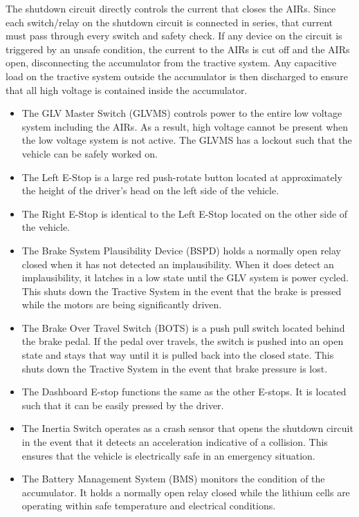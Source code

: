 \documentclass{article}
\begin{document}
The shutdown circuit directly controls the current that closes the AIRs. Since each switch/relay on the shutdown circuit is connected in series, that current must pass through every switch and safety check. If any device on the circuit is triggered by an unsafe condition, the current to the AIRs is cut off and the AIRs open, disconnecting the accumulator from the tractive system. Any capacitive load on the tractive system outside the accumulator is then discharged to ensure that all high voltage is contained inside the accumulator. 

	\begin{itemize}
		\item The GLV Master Switch (GLVMS) controls power to the entire low voltage system including the AIRs. As a result, high voltage cannot be present when the low voltage system is not active. The GLVMS has a lockout such that the vehicle can be safely worked on. 
		\item The Left E-Stop is a large red push-rotate button located at approximately the height of the driver's head on the left side of the vehicle. 
		\item The Right E-Stop is identical to the Left E-Stop located on the other side of the vehicle. 
		\item The Brake System Plausibility Device (BSPD) holds a normally open relay closed when it has not detected an implausibility. When it does detect an implausibility, it latches in a low state until the GLV system is power cycled. This shuts down the Tractive System in the event that the brake is pressed while the motors are being significantly driven.  
		\item The Brake Over Travel Switch (BOTS) is a push pull switch located behind the brake pedal. If the pedal over travels, the switch is pushed into an open state and stays that way until it is pulled back into the closed state. This shuts down the Tractive System in the event that brake pressure is lost. 
		\item The Dashboard E-stop functions the same as the other E-stops. It is located such that it can be easily pressed by the driver. 
		\item The Inertia Switch operates as a crash sensor that opens the shutdown circuit in the event that it detects an acceleration indicative of a collision. This ensures that the vehicle is electrically safe in an emergency situation. 
		\item The Battery Management System (BMS) monitors the condition of the accumulator. It holds a normally open relay closed while the lithium cells are operating within safe temperature and electrical conditions. 

\end{itemize}
\end{document}
